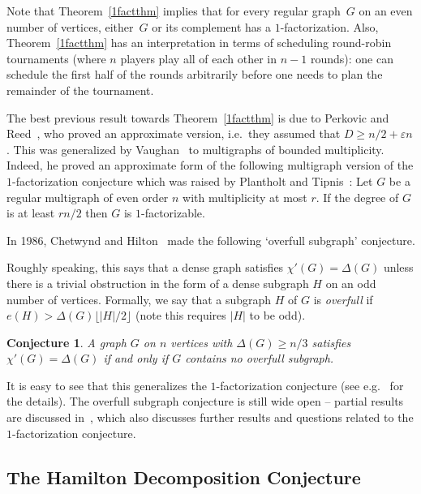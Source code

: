 \documentclass{memo-l}
\newtheorem{conjecture}[firstthm]{Conjecture}
\def\COMMENT#1{}
\def\eps{\varepsilon}
\numberwithin{section}{chapter}
\numberwithin{equation}{section}
\numberwithin{firstthm}{section}
\numberwithin{figure}{section}
\begin{document}
Note that Theorem~\ref{1factthm} implies that for every regular graph~$G$ on an even number of vertices, 
either~$G$ or its complement has a $1$-factorization.
Also, Theorem~\ref{1factthm} has an interpretation in terms of scheduling round-robin tournaments
(where $n$ players play all of each other in $n-1$ rounds):
one can schedule the first half of the rounds arbitrarily before one needs to plan the remainder of the tournament.

The best previous result towards Theorem~\ref{1factthm} is due to Perkovic and Reed~\cite{reed}, who proved an approximate version,
i.e.~they assumed that $D \ge n/2+\eps n$.
This was generalized by Vaughan~\cite{vaughan} to multigraphs of bounded multiplicity.
Indeed, he proved an approximate form of the following multigraph version of the $1$-factorization conjecture which was raised by
Plantholt and Tipnis~\cite{PT}:
Let $G$ be a regular multigraph of even order $n$ with multiplicity at most $r$.
If the degree of $G$ is at least $rn/2$ then $G$ is $1$-factorizable.


In 1986, Chetwynd and Hilton~\cite{overfull} made the following `overfull subgraph' conjecture.%
\COMMENT{Deryk changed this}
Roughly speaking, this says that a dense graph satisfies
$\chi'(G)=\Delta(G)$ unless there is a trivial obstruction in the form of a dense subgraph $H$ on an odd number of vertices.
Formally, we say that a subgraph $H$ of $G$ is \emph{overfull} if  
$e(H) > \Delta (G) \lfloor |H|/2 \rfloor$ (note this requires $|H|$ to be odd). 
\begin{conjecture}
A graph $G$ on $n$ vertices with $\Delta (G) \geq n/3$ satisfies $\chi'(G)=\Delta(G)$ if and only if $G$ contains no overfull subgraph. 
\end{conjecture}
It is easy to see that this generalizes the $1$-factorization conjecture (see e.g.~\cite{car} for the details).
The overfull subgraph conjecture is still wide open -- partial results are discussed in~\cite{stiebitz}, which also discusses further results
and questions related to the $1$-factorization conjecture.

\subsection{The Hamilton Decomposition Conjecture}
\end{document}
